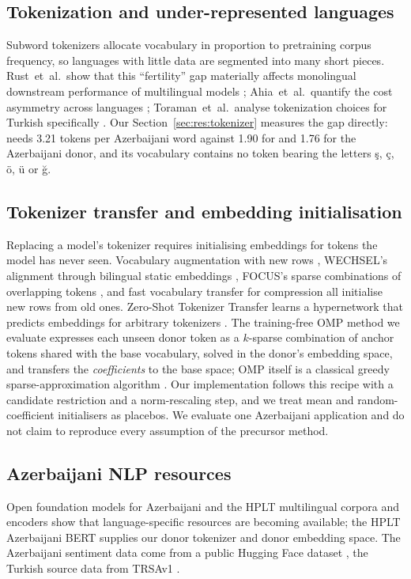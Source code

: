 \subsection{Tokenization and under-represented languages}
Subword tokenizers \cite{sennrich2016bpe,kudo2018sentencepiece} allocate vocabulary in proportion to pretraining corpus frequency, so languages with little data are segmented into many short pieces. Rust~et~al.\ show that this ``fertility'' gap materially affects monolingual downstream performance of multilingual models \cite{rust2021tokenizer}; Ahia~et~al.\ quantify the cost asymmetry across languages \cite{ahia2023cost}; Toraman~et~al.\ analyse tokenization choices for Turkish specifically \cite{toraman2023tokenization}. Our Section~\ref{sec:res:tokenizer} measures the gap directly: \xlmxv{} needs 3.21 tokens per Azerbaijani word against 1.90 for \xlmr{} and 1.76 for the Azerbaijani donor, and its vocabulary contains no token bearing the letters ş, ç, ö, ü or ğ.

\subsection{Tokenizer transfer and embedding initialisation}
Replacing a model's tokenizer requires initialising embeddings for tokens the model has never seen. Vocabulary augmentation with new rows \cite{chau2020parsing}, WECHSEL's alignment through bilingual static embeddings \cite{minixhofer2022wechsel}, FOCUS's sparse combinations of overlapping tokens \cite{dobler2023focus}, and fast vocabulary transfer for compression \cite{gee2022fvt} all initialise new rows from old ones. Zero-Shot Tokenizer Transfer learns a hypernetwork that predicts embeddings for arbitrary tokenizers \cite{minixhofer2024zett}. The training-free OMP method we evaluate \cite{goddard2025omp} expresses each unseen donor token as a $k$-sparse combination of anchor tokens shared with the base vocabulary, solved in the donor's embedding space, and transfers the \emph{coefficients} to the base space; OMP itself is a classical greedy sparse-approximation algorithm \cite{pati1993omp,tropp2007omp}. Our implementation follows this recipe with a candidate restriction and a norm-rescaling step, and we treat mean and random-coefficient initialisers as placebos. We evaluate one Azerbaijani application and do not claim to reproduce every assumption of the precursor method.

\subsection{Azerbaijani NLP resources}
Open foundation models for Azerbaijani \cite{isbarov2024azerbaijani} and the HPLT multilingual corpora and encoders \cite{degibert2024hplt} show that language-specific resources are becoming available; the HPLT Azerbaijani BERT \cite{hplt2024bertaz} supplies our donor tokenizer and donor embedding space. The Azerbaijani sentiment data come from a public Hugging Face dataset \cite{localdoc2024sentiment}, the Turkish source data from TRSAv1 \cite{aydogan2023trsav1}.

